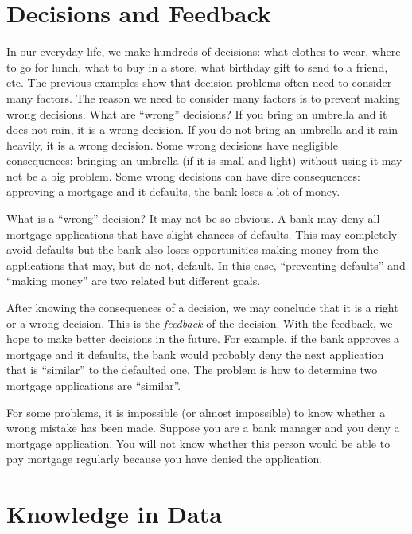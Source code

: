 \section{Decisions and Feedback}

In our everyday life, we make hundreds of decisions: what clothes to
wear, where to go for lunch, what to buy in a store, what birthday
gift to send to a friend, etc.  The previous examples show that
decision problems often need to consider many factors.  The reason we
need to consider many factors is to prevent making wrong decisions.
What are ``wrong'' decisions? If you bring an umbrella and it does not
rain, it is a wrong decision.  If you do not bring an umbrella and it
rain heavily, it is a wrong decision.  Some wrong decisions have
negligible consequences: bringing an umbrella (if it is small and
light) without using it may not be a big problem.  Some wrong
decisions can have dire consequences: approving a mortgage and it
defaults, the bank loses a lot of money.

What is a ``wrong'' decision? It may not be so obvious.  A bank may
deny all mortgage applications that have slight chances of
defaults. This may completely avoid defaults but the bank also loses
opportunities making money from the applications that may, but do not,
default.  In this case, ``preventing defaults'' and ``making money''
are two related but different goals.


After knowing the consequences of a decision, we may conclude that it
is a right or a wrong decision. This is the {\it feedback} of the
decision.  With the feedback, we hope to make better decisions in the
future. For example, if the bank approves a mortgage and it defaults,
the bank would probably deny the next application that is ``similar''
to the defaulted one.  The problem is how to determine two mortgage
applications are ``similar''.

For some problems, it is impossible (or almost impossible) to know
whether a wrong mistake has been made. Suppose you are a bank manager
and you deny a mortgage application. You will not know whether this
person would be able to pay mortgage regularly because you have denied
the application.



\section{Knowledge in Data}

